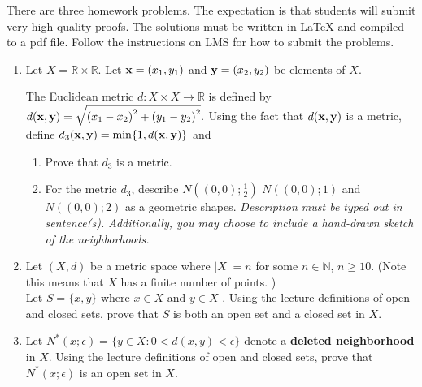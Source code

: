 \documentclass{article}
\begin{document}

\medskip

There are three homework problems. The expectation is that students
will submit very high quality proofs. The solutions must be written
in LaTeX and compiled to a pdf file. 
Follow the instructions on LMS for how to submit the problems.

\bigskip
\bigskip


\begin{enumerate}


\item Let $X = \mathbb{R} \times \mathbb{R}$. 
Let ${\bf x}=(x_1,y_1) $ and ${\bf y} = (x_2,y_2)$ be elements of $X.$

The Euclidean metric  $d:X \times X \to \mathbb{R}$ is defined by $d({\bf x},{\bf y}) = \sqrt{\left(x_1-x_2\right)^2+ \left(y_1-y_2\right)^2}.$ Using the fact that $d({\bf x},{\bf y})$ is a metric, define
$d_3({\bf x},{\bf y}) = \min\{1,d({\bf x},{\bf y})\}$  and
\begin{enumerate}
\item Prove that $d_3$ is a metric.
\item For the metric $d_3$, describe $N((0,0);\frac{1}{2})$ $N((0,0);1)$ and $N((0,0);2)$ as a geometric shapes. {\em Description must be typed out in sentence(s). Additionally, you may choose to include a  hand-drawn sketch of the neighborhoods.}
\end{enumerate}

\item Let $(X,d)$ be a metric space where $\Big| X \Big| =n$ for some $n \in \mathbb{N}$, $n \ge 10$. (Note this means that $X$ has a finite number of points. )\\
Let $S = \{ x ,y \}$ where $x \in X$ and $y \in X$ .
 Using the lecture definitions of open and closed sets, prove that $S$ is both an open set and a closed set in $X$.



\item Let $\displaystyle {N}^*(x;\epsilon) = \{ y \in X: 0 < d(x,y) <  \epsilon \}$ denote a {\bf deleted neighborhood} in $X$.  Using the lecture definitions %
of open and closed sets, prove that $\displaystyle {N}^*(x;\epsilon)$ is an open set in $X$.


\end{enumerate}
\end{document}
